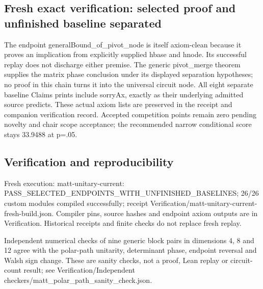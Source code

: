 \documentclass[11pt,a4paper]{article}
\begin{document}
\subsection{Fresh exact verification: selected proof and unfinished baseline separated}
The endpoint generalBound\_of\_pivot\_node is itself axiom-clean because it proves an implication from explicitly supplied hbase and hnode. Its successful replay does not discharge either premise. The generic pivot\_merge theorem supplies the matrix phase conclusion under its displayed separation hypotheses; no proof in this chain turns it into the universal circuit node. All eight separate baseline Claims prints include sorryAx, exactly as their underlying admitted source predicts. These actual axiom lists are preserved in the receipt and companion verification record. Accepted competition points remain zero pending novelty and chair scope acceptance; the recommended narrow conditional score stays 33.9488 at p=.05.

\subsection{Verification and reproducibility}
Fresh execution: matt-unitary-current: PASS\_SELECTED\_ENDPOINTS\_WITH\_UNFINISHED\_BASELINES; 26/26 custom modules compiled successfully; receipt Verification/matt-unitary-current-fresh-build.json. Compiler pins, source hashes and endpoint axiom outputs are in Verification. Historical receipts and finite checks do not replace fresh replay.

{\small Independent numerical checks of nine generic block pairs in dimensions 4, 8 and 12 agree with the polar-path unitarity, determinant phase, endpoint reversal and Walsh sign change. These are sanity checks, not a proof, Lean replay or circuit-count result; see Verification/Independent checkers/matt\_polar\_path\_sanity\_check.json.\par}
\end{document}
